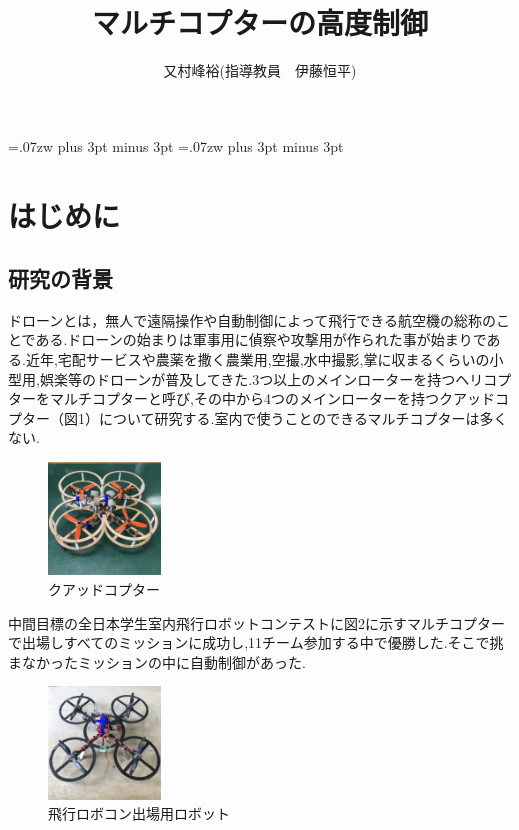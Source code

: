 \documentclass[twocolumn,11pt]{abst}
\title{マルチコプターの高度制御}%
\author{又村峰裕(指導教員　伊藤恒平)}
\begin{document}
\maketitle
\thispagestyle{fancy}
\pagestyle{fancy}

\setlength{\baselineskip}{5.6truemm}
\kanjiskip=.07zw plus 3pt minus 3pt
\xkanjiskip=.07zw plus 3pt minus 3pt



\section{はじめに}
\subsection{研究の背景}
ドローンとは，無人で遠隔操作や自動制御によって飛行できる航空機の総称のことである.ドローンの始まりは軍事用に偵察や攻撃用が作られた事が始まりである.近年,宅配サービスや農薬を撒く農業用,空撮,水中撮影,掌に収まるくらいの小型用,娯楽等のドローンが普及してきた.3つ以上のメインローターを持つヘリコプターをマルチコプターと呼び,その中から4つのメインローターを持つクアッドコプター（図1）について研究する.室内で使うことのできるマルチコプターは多くない.%

\begin{figure}[htbp]
  \begin{center}
   \includegraphics[width=30mm]{img/drone.jpeg}
    \end{center}
  \caption{クアッドコプター}
 \label{fig:ensyu3tex}
\end{figure}


中間目標の全日本学生室内飛行ロボットコンテストに図2に示すマルチコプターで出場しすべてのミッションに成功し,11チーム参加する中で優勝した.そこで挑まなかったミッションの中に自動制御があった.%

\begin{figure}[htbp]
  \begin{center}
   \includegraphics[width=30mm]{img/大会機.jpeg}
    \end{center}
  \caption{飛行ロボコン出場用ロボット}
 \label{fig:ensyu3tex}
\end{figure}
\end{document}
